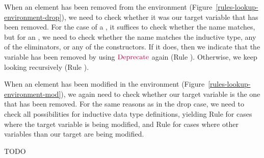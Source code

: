 

When an element has been removed from the environment
(Figure~\ref{rules-lookup-environment-drop}), we need to check whether it was
our target variable that has been removed.  For the case of a
, it suffices to check whether the name matches, but for
an , we need to check whether the name matches the
inductive type, any of the eliminators, or any of the constructors.  If it does,
then we indicate that the variable has been removed by using
$\textcolor{purple}{\text{Deprecate}}$ again (Rule ).  Otherwise,
we keep looking recursively (Rule ).



When an element has been modified in the environment
(Figure~\ref{rules-lookup-environment-mod}), we again need to check whether our
target variable is the one that has been removed.  For the same reasons as in
the drop case, we need to check all possibilities for inductive data type
definitions, yielding Rule  for cases where the
target variable is being modified, and Rule  for
cases where other variables than our target are being modified.



TODO


